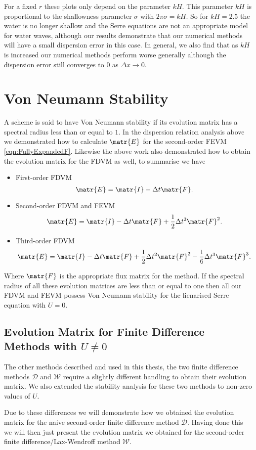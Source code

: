 For a fixed $r$ these plots only depend on the parameter $kH$. This parameter $kH$ is proportional to the shallowness parameter $\sigma$ with $2 \pi \sigma = kH $. So for $kH=2.5$ the water is no longer shallow and the Serre equations are not an appropriate model for water waves, although our results demonstrate that our numerical methods will have a small dispersion error in this case. In general, we also find that as $kH$ is increased our numerical methods perform worse generally although the dispersion error still converges to $0$ as $\Delta x \rightarrow 0$. 


\section{Von Neumann Stability}
A scheme is said to have Von Neumann stability if its evolution matrix has a spectral radius less than or equal to $1$. In the dispersion relation analysis above we demonstrated how to calculate $\matr{E}$ for the second-order FEVM \eqref{eqn:FullyExpandedF}. Likewise the above work also demonstrated how to obtain the evolution matrix for the FDVM as well, to summarise we have 
\begin{itemize}
	\item First-order FDVM
	\[\matr{E} = \matr{I} - \Delta t \matr{F}. \]
	\item Second-order FDVM and FEVM
	\[\matr{E} = \matr{I} - \Delta t \matr{F} + \frac{1}{2} \Delta t^2 \matr{F}^2.\]
	\item Third-order FDVM
	\[\matr{E} = \matr{I} - \Delta t \matr{F} + \frac{1}{2} \Delta t^2 \matr{F}^2 - \frac{1}{6} \Delta t^3 \matr{F}^3.\]
\end{itemize}
Where $\matr{F}$ is the appropriate flux matrix for the method. If the spectral radius of all these evolution matrices are less than or equal to one then all our FDVM and FEVM possess Von Neumann stability for the lienarised Serre equation with $U = 0$.

\subsection{Evolution Matrix for Finite Difference Methods with $U \neq 0$}
The other methods described and used in this thesis, the two finite difference methods $\mathcal{D}$ and $\mathcal{W}$ require a slightly different handling to obtain their evolution matrix. We also extended the stability analysis for these two methods to non-zero values of $U$.

Due to these differences we will demonstrate how we obtained the evolution matrix for the naive second-order finite difference method $\mathcal{D}$. Having done this we will then just present the evolution matrix we obtained for the second-order finite difference/Lax-Wendroff method $\mathcal{W}$.

